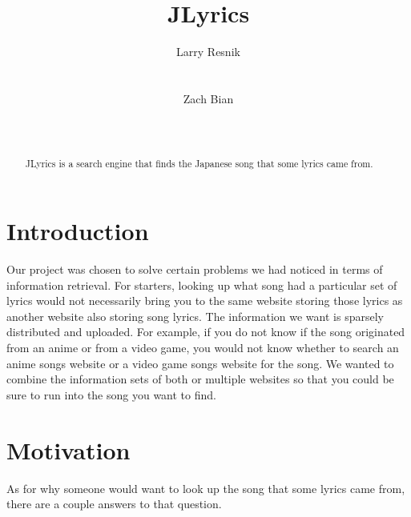 \documentclass{acm} %
\begin{document}
\sloppy %
\begin{CJK}{UTF8}{zhsong}
\title{JLyrics
}

\author{%
    \alignauthor Larry Resnik \\
    \\
    \\
    \alignauthor Zach Bian\\
    \\
    \\
}
\maketitle

\begin{abstract}
JLyrics is a search engine that finds the Japanese song that some lyrics came from.
\end{abstract}


\section{Introduction}

Our project was chosen to solve certain problems we had noticed in terms of information retrieval. For starters, looking up what song had a particular set of lyrics would not necessarily bring you to the same website storing those lyrics as another website also storing song lyrics. The information we want is sparsely distributed and uploaded. For example, if you do not know if the song originated from an anime or from a video game, you would not know whether to search an anime songs website or a video game songs website for the song. We wanted to combine the information sets of both or multiple websites so that you could be sure to run into the song you want to find.

\section{Motivation}

As for why someone would want to look up the song that some lyrics came from, there are a couple answers to that question.


\end{CJK}
\end{document}
